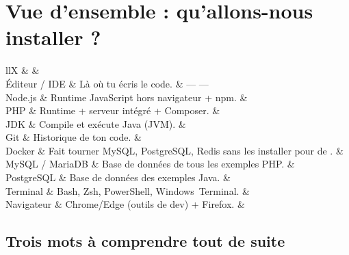 \section{Vue d'ensemble : qu'allons-nous installer ?}

\begin{tabz}{llX}
  \headrow {} \&  \&  \\
  \midrule
  \'Editeur / IDE \& L\`a o\`u tu \'ecris le code. \&  ---  ---  \\
  Node.js \& Runtime JavaScript hors navigateur + npm. \&  \\
  PHP \& Runtime + serveur int\'egr\'e + Composer. \&  \\
  JDK \& Compile et ex\'ecute Java (JVM). \&  \\
  Git \& Historique de ton code. \&  \\
  Docker \& Fait tourner MySQL, PostgreSQL, Redis sans les installer \og  pour de  \fg{}. \&  \\
  MySQL / MariaDB \& Base de donn\'ees de tous les exemples PHP. \&  \\
  PostgreSQL \& Base de donn\'ees des exemples Java. \&  \\
  Terminal \& Bash, Zsh, PowerShell, Windows~Terminal. \&  \\
  Navigateur \& Chrome/Edge (outils de dev) + Firefox. \&  \\
\end{tabz}

\subsection{Trois mots \`a comprendre tout de suite}

